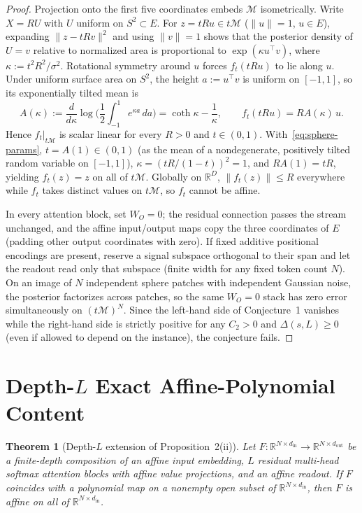 \documentclass[11pt]{article}
\theoremstyle{plain}
\newtheorem{theorem}{Theorem}
\theoremstyle{definition}
\theoremstyle{remark}
\begin{document}
\begin{proof}
Projection onto the first five coordinates embeds $\mathcal{M}$ isometrically. Write $X = R U$ with $U$ uniform on $S^2 \subset E$. For $z = tRu \in t\mathcal{M}$ ($\|u\| = 1$, $u \in E$), expanding $\|z - tRv\|^2$ and using $\|v\| = 1$ shows that the posterior density of $U = v$ relative to normalized area is proportional to $\exp(\kappa u^\top v)$, where $\kappa := t^2 R^2 / \sigma^2$. Rotational symmetry around $u$ forces $f_t(tRu)$ to lie along $u$. Under uniform surface area on $S^2$, the height $a := u^\top v$ is uniform on $[-1, 1]$, so its exponentially tilted mean is
\[
A(\kappa) := \frac{d}{d\kappa}\log\biggl(\frac{1}{2}\int_{-1}^1 e^{\kappa a}\,da\biggr)
= \coth\kappa - \frac{1}{\kappa},
\qquad
f_t(tRu) = R A(\kappa)\,u.
\]
Hence $f_t|_{t\mathcal{M}}$ is scalar linear for every $R > 0$ and $t \in (0, 1)$. With~\eqref{eq:sphere-params}, $t = A(1) \in (0, 1)$ (as the mean of a nondegenerate, positively tilted random variable on $[-1, 1]$), $\kappa = (tR/(1-t))^2 = 1$, and $RA(1) = tR$, yielding $f_t(z) = z$ on all of $t\mathcal{M}$. Globally on $\mathbb{R}^D$, $\|f_t(z)\| \le R$ everywhere while $f_t$ takes distinct values on $t\mathcal{M}$, so $f_t$ cannot be affine.

In every attention block, set $W_O = 0$; the residual connection passes the stream unchanged, and the affine input/output maps copy the three coordinates of $E$ (padding other output coordinates with zero). If fixed additive positional encodings are present, reserve a signal subspace orthogonal to their span and let the readout read only that subspace (finite width for any fixed token count $N$). On an image of $N$ independent sphere patches with independent Gaussian noise, the posterior factorizes across patches, so the same $W_O = 0$ stack has zero error simultaneously on $(t\mathcal{M})^N$. Since the left-hand side of Conjecture~1 vanishes while the right-hand side is strictly positive for any $C_2 > 0$ and $\Delta(s, L) \ge 0$ (even if allowed to depend on the instance), the conjecture fails.
\end{proof}

\section{Depth-$L$ Exact Affine-Polynomial Content}

\begin{theorem}[Depth-$L$ extension of Proposition~2(ii)]\label{thm:depthL}
Let $F : \mathbb{R}^{N \times d_{\mathrm{in}}} \to \mathbb{R}^{N \times d_{\mathrm{out}}}$ be a finite-depth composition of an affine input embedding, $L$ residual multi-head softmax attention blocks with affine value projections, and an affine readout. If $F$ coincides with a polynomial map on a nonempty open subset of $\mathbb{R}^{N \times d_{\mathrm{in}}}$, then $F$ is affine on all of $\mathbb{R}^{N \times d_{\mathrm{in}}}$.
\end{theorem}
\end{document}
